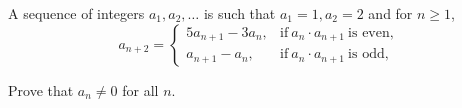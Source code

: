 A sequence of integers $a_1,a_2,\ldots $ is such that $a_1=1,a_2=2$ and for $n\ge 1$, \[a_{n+2}=\left\{\begin{array}{cl}5a_{n+1}-3a_{n}, &\text{if}\ a_n\cdot a_{n+1}\ \text{is even},\\ a_{n+1}-a_{n}, &\text{if}\ a_n\cdot a_{n+1}\ \text{is odd},\end{array}\right. \]

Prove that $a_n\not= 0$ for all $n$.